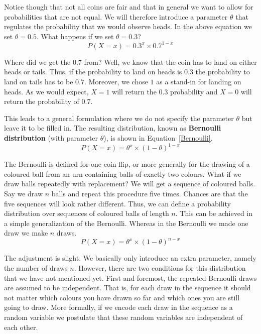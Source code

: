 \documentclass[a4paper,11pt,leqno]{report}
\begin{document}
Notice though that not all coins are fair and that in general we want to allow for probabilities that are not equal. 
We will therefore introduce a parameter $ \theta $ that regulates the probability that we would observe heads. In the
above equation we set $ \theta = 0.5 $. What happens if we set $ \theta = 0.3 $?
\begin{equation}
P(X=x) = 0.3^{x} \times 0.7^{1-x}
\end{equation}

Where did we get the 0.7 from? Well, we know that the coin has to land on either heads or tails. Thus, if the probability
to land on heads is $ 0.3 $ the probability to land on tails has to be $ 0.7 $. Moreover, we chose $ 1 $ as a stand-in for
landing on heads. As we would expect, $ X = 1 $ will return the $ 0.3 $ probability and $ X = 0 $ will return the probability of $ 0.7 $.

This leads to a general formulation where we do not specify the parameter $ \theta $ but leave it to be filled in. 
The resulting distribution, known as \textbf{Bernoulli distribution} (with parameter $ \theta $), is shown in Equation~\eqref{Bernoulli}.
\begin{equation}\label{Bernoulli}
P(X=x) = \theta^{x} \times (1 - \theta)^{1-x}
\end{equation}

The Bernoulli is defined for one coin flip, or more generally for the drawing of a coloured ball from an urn containing balls
of exactly two colours. What if we draw balls repeatedly with replacement? We will get a sequence of coloured balls. 
Say we draw $ n $ balls and repeat this procedure five times. Chances are that the five sequences will look rather different.
Thus, we can define a probability distribution over sequences of coloured balls of length $ n $. This can be achieved in a simple generalization
of the Bernoulli. Whereas in the Bernoulli we made one draw we make $ n $ draws.
\begin{equation}\label{Multinoulli}
P(X=x) = \theta^{x} \times (1 - \theta)^{n-x}
\end{equation}

The adjustment is slight. We basically only introduce an extra parameter, namely the number of draws $ n $. 
However, there are two conditions for this distribution that we have not mentioned yet. First and foremost,
the repeated Bernoulli draws are assumed to be independent. That is, for each draw in the sequence it should not matter which colours you
have drawn so far and which ones you are still going to draw. More formally, if we encode each draw in the sequence as a random
variable we postulate that these random variables are independent of each other. 
\end{document}
